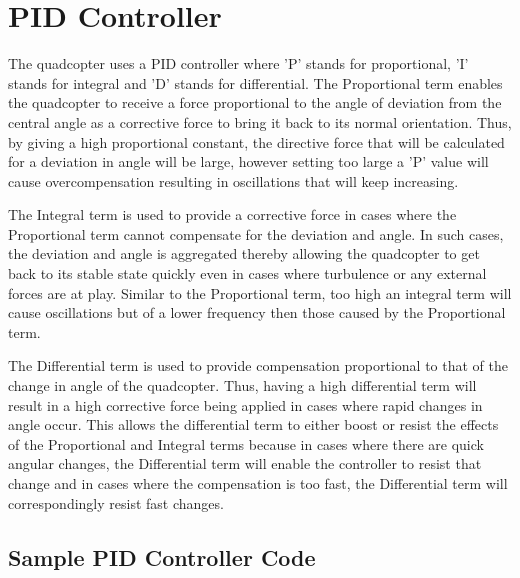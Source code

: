 
\chapter{PID Controller}
The quadcopter uses a PID controller where 'P' stands for proportional, 'I' stands for integral and 'D' stands for differential. The Proportional term enables the quadcopter to receive a force proportional to the angle of deviation from the central angle as a corrective force to bring it back to its normal orientation. Thus, by giving a high proportional constant, the directive force that will be calculated for a deviation in angle will be large, however setting too large a 'P' value will cause overcompensation resulting in oscillations that will keep increasing.

The Integral term is used to provide a corrective force in cases where the Proportional term cannot compensate for the deviation and angle. In such cases, the deviation and angle is aggregated thereby allowing the quadcopter to get back to its stable state quickly even in cases where turbulence or any external forces are at play. Similar to the Proportional term, too high an integral term  will cause oscillations but of a lower frequency then those caused by the Proportional term.

The Differential term  is used to provide compensation proportional to that of the change in angle of the quadcopter. Thus, having a high differential term will result in a high corrective force being applied in cases where rapid changes in angle occur. This allows the differential term  to either boost or resist the effects of the Proportional and Integral terms because in cases where there are quick angular changes, the Differential term will enable the controller to resist that change and in cases where the compensation is too fast, the Differential term will correspondingly resist fast changes.
\section{Sample PID Controller Code}
   
